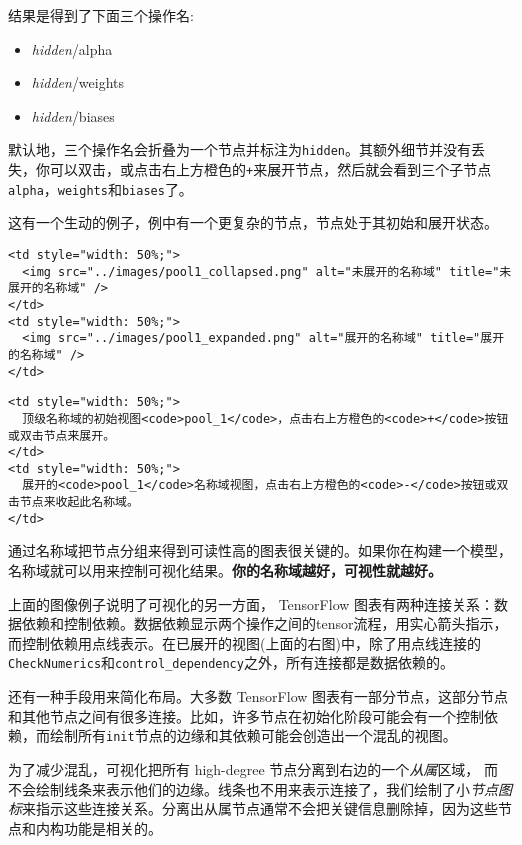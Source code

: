 结果是得到了下面三个操作名:

\begin{itemize}
\tightlist
\item
  \emph{hidden}/alpha
\item
  \emph{hidden}/weights
\item
  \emph{hidden}/biases
\end{itemize}

默认地，三个操作名会折叠为一个节点并标注为\texttt{hidden}。其额外细节并没有丢失，你可以双击，或点击右上方橙色的\texttt{+}来展开节点，然后就会看到三个子节点\texttt{alpha}，\texttt{weights}和\texttt{biases}了。

这有一个生动的例子，例中有一个更复杂的节点，节点处于其初始和展开状态。

\begin{verbatim}
<td style="width: 50%;">
  <img src="../images/pool1_collapsed.png" alt="未展开的名称域" title="未展开的名称域" />
</td>
<td style="width: 50%;">
  <img src="../images/pool1_expanded.png" alt="展开的名称域" title="展开的名称域" />
</td>
\end{verbatim}

\begin{verbatim}
<td style="width: 50%;">
  顶级名称域的初始视图<code>pool_1</code>，点击右上方橙色的<code>+</code>按钮或双击节点来展开。
</td>
<td style="width: 50%;">
  展开的<code>pool_1</code>名称域视图，点击右上方橙色的<code>-</code>按钮或双击节点来收起此名称域。
</td>
\end{verbatim}

通过名称域把节点分组来得到可读性高的图表很关键的。如果你在构建一个模型，名称域就可以用来控制可视化结果。\textbf{你的名称域越好，可视性就越好。}

上面的图像例子说明了可视化的另一方面， TensorFlow
图表有两种连接关系：数据依赖和控制依赖。数据依赖显示两个操作之间的tensor流程，用实心箭头指示，而控制依赖用点线表示。在已展开的视图(上面的右图)中，除了用点线连接的\texttt{CheckNumerics}和\texttt{control\_dependency}之外，所有连接都是数据依赖的。

还有一种手段用来简化布局。大多数 TensorFlow
图表有一部分节点，这部分节点和其他节点之间有很多连接。比如，许多节点在初始化阶段可能会有一个控制依赖，而绘制所有\texttt{init}节点的边缘和其依赖可能会创造出一个混乱的视图。

为了减少混乱，可视化把所有 high-degree
节点分离到右边的一个\emph{从属}区域，
而不会绘制线条来表示他们的边缘。线条也不用来表示连接了，我们绘制了小\emph{节点图标}来指示这些连接关系。分离出从属节点通常不会把关键信息删除掉，因为这些节点和内构功能是相关的。

